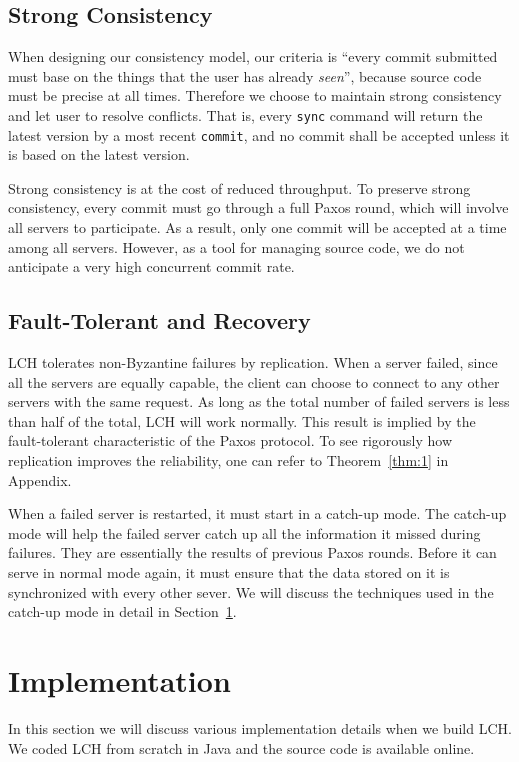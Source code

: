 \documentclass[11pt]{article}
\begin{document}
\subsection{Strong Consistency}
When designing our consistency model, our criteria is ``every commit submitted must base on the things that the user has already \emph{seen}'', because source code must be precise at all times.
Therefore we choose to maintain strong consistency and let user to resolve conflicts.
That is, every \texttt{sync} command will return the latest version by a most recent \texttt{commit}, and no commit shall be accepted unless it is based on the latest version.

Strong consistency is at the cost of reduced throughput.
To preserve strong consistency, every commit must go through a full Paxos round, which will involve all servers to participate.
As a result, only one commit will be accepted at a time among all servers.
However, as a tool for managing source code, we do not anticipate a very high concurrent commit rate.

\subsection{Fault-Tolerant and Recovery}
LCH tolerates non-Byzantine failures by replication.
When a server failed, since all the servers are equally capable, the client can choose to connect to any other servers with the same request.
As long as the total number of failed servers is less than half of the total, LCH will work normally.
This result is implied by the fault-tolerant characteristic of the Paxos protocol.
To see rigorously how replication improves the reliability, one can refer to Theorem~\ref{thm:1} in Appendix.

When a failed server is restarted, it must start in a catch-up mode.
The catch-up mode will help the failed server catch up all the information it missed during failures.
They are essentially the results of previous Paxos rounds.
Before it can serve in normal mode again, it must ensure that the data stored on it is synchronized with every other sever.
We will discuss the techniques used in the catch-up mode in detail in Section~\ref{sec:impl}.

\section{Implementation}
\label{sec:impl}
In this section we will discuss various implementation details when we build LCH.
We coded LCH from scratch in Java and the source code is available online\footnotemark.
\end{document}
